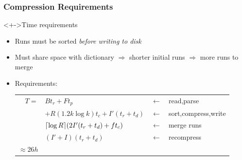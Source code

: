 \documentclass[svgnames]{beamer}
\begin{document}
\begin{frame}
    \frametitle{Compression Requirements}

    \vspace{-1ex}

    \begin{exampleblock}<+->{Time requirements}
        \small
        \begin{itemize}
            \setlength{\itemsep}{-1ex}
        \item Runs must be sorted \textit{before writing to disk}
        \item Must share space with dictionary $\Rightarrow$ shorter initial runs
            $\Rightarrow$ more runs to merge
        \item Requirements:
            \begin{tabular}{rlcl}
                $T =$ & $Bt_r + Ft_p$ & $\leftarrow$ & read,parse \\
                & $+R(1.2k\log k)t_c + I'(t_r + t_d)$ & $\leftarrow$ & sort,compress,write \\
                & $\lceil \log R \rceil(2I'(t_r + t_d) + ft_c)$ & $\leftarrow$ & merge runs \\
                & $(I' + I)(t_r + t_d)$ & $\leftarrow$ & recompress \\
                \emph{$\approx 26h$}
            \end{tabular}
        \end{itemize}
    \end{exampleblock}



\end{frame}
\end{document}
